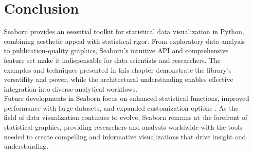 \section{Conclusion}
\label{sec:conclusion}

Seaborn provides an essential toolkit for statistical data visualization in Python, combining aesthetic appeal with statistical rigor. From exploratory data analysis to publication-quality graphics, Seaborn's intuitive API and comprehensive feature set make it indispensable for data scientists and researchers. The examples and techniques presented in this chapter demonstrate the library's versatility and power, while the architectural understanding enables effective integration into diverse analytical workflows.\\

Future developments in Seaborn focus on enhanced statistical functions, improved performance with large datasets, and expanded customization options \cite{Waskom:2021}. As the field of data visualization continues to evolve, Seaborn remains at the forefront of statistical graphics, providing researchers and analysts worldwide with the tools needed to create compelling and informative visualizations that drive insight and understanding.